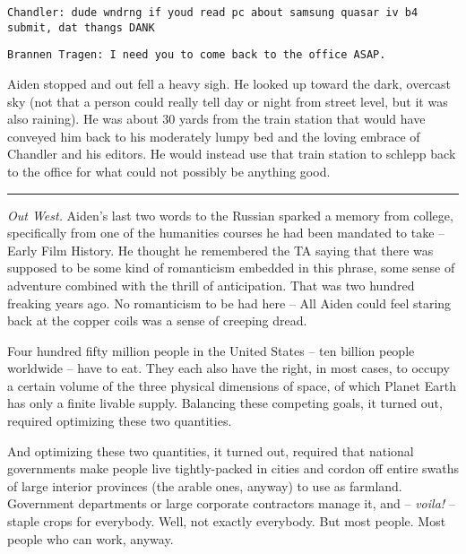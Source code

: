 \documentclass[11pt]{book}
\begin{document}
	\vspace{0.5cm}
	
	\texttt{Chandler: dude wndrng if youd read pc about samsung quasar iv b4 submit, dat thangs DANK} 
	
	\texttt{Brannen Tragen: I need you to come back to the office ASAP.}
	
	\vspace{0.5cm}
	
	Aiden stopped and out fell a heavy sigh. He looked up toward the dark, overcast sky (not that a person could really tell day or night from street level, but it was also raining). He was about 30 yards from the train station that would have conveyed him back to his moderately lumpy bed and the loving embrace of Chandler and his editors. He would instead use that train station to schlepp back to the office for what could not possibly be anything good.
	
	\vspace{0.5cm}
	\hrule
	\vspace{0.5cm}
	
	\textit{Out West.} Aiden's last two words to the Russian sparked a memory from college, specifically from one of the humanities courses he had been mandated to take -- Early Film History. He thought he remembered the TA saying that there was supposed to be some kind of romanticism embedded in this phrase, some sense of adventure combined with the thrill of anticipation. That was two hundred freaking years ago. No romanticism to be had here -- All Aiden could feel staring back at the copper coils was a sense of creeping dread.
	
	Four hundred fifty million people in the United States -- ten billion people worldwide -- have to eat. They each also have the right, in most cases, to occupy a certain volume of the three physical dimensions of space, of which Planet Earth has only a finite livable supply. Balancing these competing goals, it turned out, required optimizing these two quantities.
	
	And optimizing these two quantities, it turned out, required that national governments make people live tightly-packed in cities and cordon off entire swaths of large interior provinces (the arable ones, anyway) to use as farmland. Government departments or large corporate contractors manage it, and -- \textit{voila!} -- staple crops for everybody. Well, not exactly everybody. But most people. Most people who can work, anyway.
	
\end{document}
